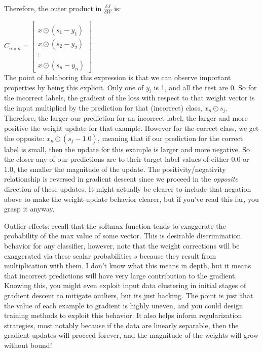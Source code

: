\documentclass{article}
\begin{document}
Therefore, the outer product in $\frac{\delta J}{\delta W}$ is:

$C_{n \times n} = \begin{bmatrix} \\
         x \odot (s_{1} - y_{1}) \\
         x \odot (s_{2} - y_{2}) \\
          \vdots \\
         x \odot (s_{n} - y_{n})
         \end{bmatrix}
$ \\

The point of belaboring this expression is that we can observe important properties by being this explicit. Only one of $y_{i}$ is 1, and all the rest are 0. So for the incorrect labels, the gradient of the loss with respect to that weight vector is the input multiplied by the prediction for that (incorrect) class, $x_{n} \odot s_{j}$. Therefore, the larger our prediction for an incorrect label, the larger and more positive the weight update for that example. However for the correct class, we get the opposite: $x_{n} \odot (s_{j} - 1.0)$, meaning that if our prediction for the correct label is small, then the update for this example is larger and more negative. So the closer any of our predictions are to their target label values of either 0.0 or 1.0, the smaller the magnitude of the update. The positivity/negativity relationship is reversed in gradient descent since we proceed in the \textit{opposite} direction of these updates. It might actually be clearer to include that negation above to make the weight-update behavior clearer, but if you've read this far, you grasp it anyway.

Outlier effects: recall that the softmax function tends to exaggerate the probability of the max value of some vector. This is desirable discrimination behavior for any classifier, however, note that the weight corrections will be exaggerated via these scalar probabilities $s$ because they result from multiplication with them. I don't know what this means in depth, but it means that incorrect predictions will have very large contribution to the gradient. Knowing this, you might even exploit input data clustering in initial stages of gradient descent to mitigate outliers, but its just hacking. The point is just that the value of each example to gradient is highly uneven, and you could design training methods to exploit this behavior. It also helps inform regularization strategies, most notably because if the data are linearly separable, then the gradient updates will proceed forever, and the magnitude of the weights will grow without bound!
\end{document}
